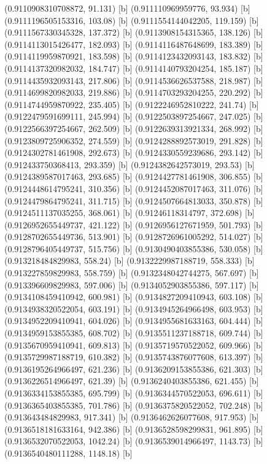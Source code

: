 {{{(0.9110908310708872, 91.131) [b] 
(0.911110969959776, 93.934) [b] 
(0.9111196505153316, 103.08) [b] 
(0.9111554144042205, 119.159) [b] 
(0.9111567330345328, 137.372) [b] 
(0.9113908154315365, 138.126) [b] 
(0.9114113015426477, 182.093) [b] 
(0.9114116487648699, 183.389) [b] 
(0.9114119959870921, 183.598) [b] 
(0.9114123432093143, 183.832) [b] 
(0.9114137320982032, 184.747) [b] 
(0.9114140793204254, 185.187) [b] 
(0.9114435932093143, 217.806) [b] 
(0.9114536626537588, 218.987) [b] 
(0.9114699820982033, 219.886) [b] 
(0.9114703293204255, 220.292) [b] 
(0.9114744959870922, 235.405) [b] 
(0.9122246952810222, 241.74) [b] 
(0.9122479591699111, 245.994) [b] 
(0.9122503897254667, 247.025) [b] 
(0.9122566397254667, 262.509) [b] 
(0.9122639313921334, 268.992) [b] 
(0.9123809725906352, 274.559) [b] 
(0.9124288892573019, 291.828) [b] 
(0.9124302781461908, 292.673) [b] 
(0.9124330559239686, 293.142) [b] 
(0.912433750368413, 293.359) [b] 
(0.9124382642573019, 293.53) [b] 
(0.9124389587017463, 293.685) [b] 
(0.9124427781461908, 306.855) [b] 
(0.9124448614795241, 310.356) [b] 
(0.9124452087017463, 311.076) [b] 
(0.9124479864795241, 311.715) [b] 
(0.9124507664813033, 350.878) [b] 
(0.9124511137035255, 368.061) [b] 
(0.91246118314797, 372.698) [b] 
(0.9126952655449737, 421.122) [b] 
(0.9126956127671959, 501.793) [b] 
(0.9128702655449736, 513.901) [b] 
(0.9128726961005292, 514.027) [b] 
(0.9128796405449737, 515.756) [b] 
(0.9130490403855386, 530.058) [b] 
(0.913218484829983, 558.24) [b] 
(0.9132229987188719, 558.333) [b] 
(0.913227859829983, 558.759) [b] 
(0.9132348042744275, 567.697) [b] 
(0.913396609829983, 597.006) [b] 
(0.9134052903855386, 597.117) [b] 
(0.9134108459410942, 600.981) [b] 
(0.9134827209410943, 603.108) [b] 
(0.9134938320522054, 603.191) [b] 
(0.9134945264966498, 603.953) [b] 
(0.9134952209410941, 604.026) [b] 
(0.9134955681633163, 604.444) [b] 
(0.9134959153855385, 608.702) [b] 
(0.9135511237188718, 609.744) [b] 
(0.9135670959410941, 609.813) [b] 
(0.9135719570522052, 609.966) [b] 
(0.9135729987188719, 610.382) [b] 
(0.9135743876077608, 613.397) [b] 
(0.9136195264966497, 621.236) [b] 
(0.9136209153855386, 621.303) [b] 
(0.9136226514966497, 621.39) [b] 
(0.9136240403855386, 621.455) [b] 
(0.9136334153855385, 695.799) [b] 
(0.9136344570522053, 696.611) [b] 
(0.9136365403855385, 701.786) [b] 
(0.9136375820522052, 702.248) [b] 
(0.913643484829983, 917.341) [b] 
(0.9136462626077608, 917.953) [b] 
(0.9136518181633164, 942.386) [b] 
(0.9136528598299831, 961.895) [b] 
(0.9136532070522053, 1042.24) [b] 
(0.9136539014966497, 1143.73) [b] 
(0.9136540480111288, 1148.18) [b] 
}}}
